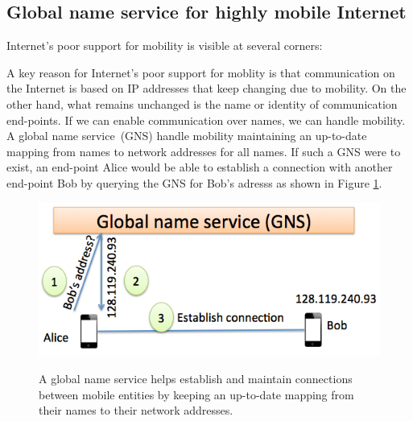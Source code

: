 \subsection{Global name service for highly mobile Internet}


Internet's poor support for mobility is visible at several corners: 

A key reason for Internet's poor support for moblity is that communication on the Internet is based on IP addresses that keep changing due to mobility. On the other hand, what remains unchanged is the name or identity of communication end-points. If we can enable communication over names, we can handle mobility. A  global name service (GNS) handle mobility maintaining an up-to-date mapping from names to network addresses for all names. If such a GNS were to exist, an end-point Alice would be able to establish a connection with another end-point Bob by querying the GNS for Bob's adresss as shown in Figure \ref{fig:gns-example}. 

\begin{figure}
	\centering
	\includegraphics[scale=0.4]{fig/gns-example.png}
	\label{fig:gns-example}
	\caption{A global name service helps establish and maintain connections between mobile entities by keeping an up-to-date mapping from their names to their network addresses.}
\end{figure}


